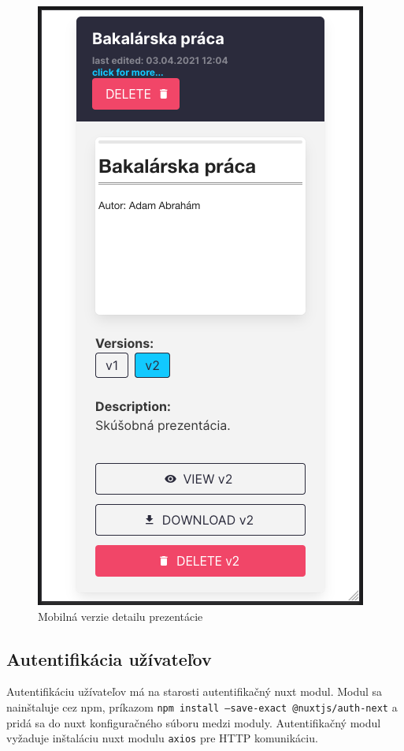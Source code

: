\begin{figure}[!hbt]
\begin{minipage}{.5\textwidth}
  \includegraphics[scale=0.2]{obrazky/mobil_detail.png}
  \caption{Mobilná verzie detailu prezentácie}
  \label{pic:mobil_detail}
\end{minipage}
\end{figure}

\subsection{Autentifikácia užívateľov}
\label{auth}
Autentifikáciu užívateľov má na starosti autentifikačný nuxt modul. Modul sa nainštaluje cez npm, príkazom \texttt{npm install --save-exact @nuxtjs/auth-next} a pridá sa do nuxt konfiguračného súboru medzi moduly. Autentifikačný modul vyžaduje inštaláciu nuxt modulu \texttt{axios} pre HTTP komunikáciu. 


